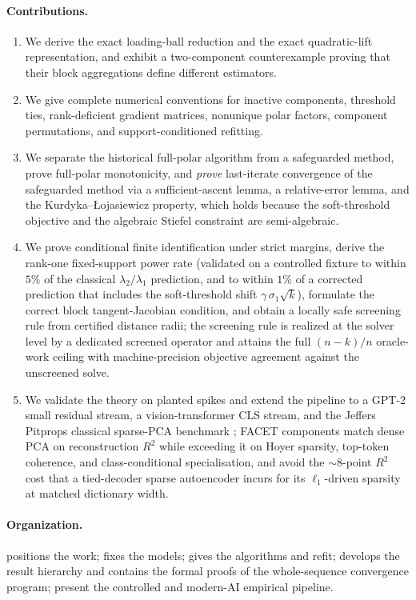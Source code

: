 \paragraph{Contributions.}
\begin{enumerate}[leftmargin=*]
  \item We derive the exact loading-ball reduction and the exact quadratic-lift representation, and exhibit a two-component counterexample proving that their block aggregations define different estimators.
  \item We give complete numerical conventions for inactive components, threshold ties, rank-deficient gradient matrices, nonunique polar factors, component permutations, and support-conditioned refitting.
  \item We separate the historical full-polar algorithm from a safeguarded method, prove full-polar monotonicity, and \emph{prove} last-iterate convergence of the safeguarded method via a sufficient-ascent lemma, a relative-error lemma, and the Kurdyka--\L{}ojasiewicz property, which holds because the soft-threshold objective and the algebraic Stiefel constraint are semi-algebraic.
  \item We prove conditional finite identification under strict margins, derive the rank-one fixed-support power rate (validated on a controlled fixture to within $5\%$ of the classical $\lambda_2/\lambda_1$ prediction, and to within $1\%$ of a corrected prediction that includes the soft-threshold shift $\gamma\,\sigma_1\sqrt{k}$), formulate the correct block tangent-Jacobian condition, and obtain a locally safe screening rule from certified distance radii; the screening rule is realized at the solver level by a dedicated screened operator and attains the full $(n-k)/n$ oracle-work ceiling with machine-precision objective agreement against the unscreened solve.
  \item We validate the theory on planted spikes and extend the pipeline to a GPT-2 small residual stream, a vision-transformer CLS stream, and the Jeffers Pitprops classical sparse-PCA benchmark \citep{jeffers1967pitprops}; FACET components match dense PCA on reconstruction $R^2$ while exceeding it on Hoyer sparsity, top-token coherence, and class-conditional specialisation, and avoid the ${\sim}8$-point $R^2$ cost that a tied-decoder sparse autoencoder incurs for its $\ell_1$-driven sparsity at matched dictionary width.
\end{enumerate}

\paragraph{Organization.}
 positions the work;  fixes the models;  gives the algorithms and refit;  develops the result hierarchy and  contains the formal proofs of the whole-sequence convergence program;  present the controlled and modern-AI empirical pipeline.




